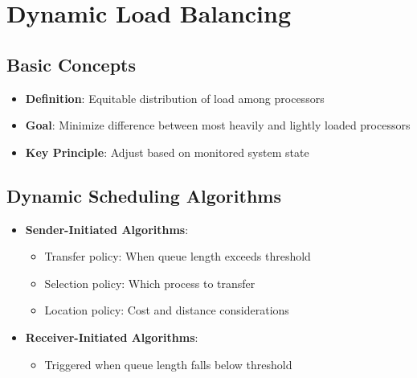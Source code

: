 \documentclass[12pt]{article}
\begin{document}
\section{Dynamic Load Balancing}

\subsection{Basic Concepts}
\begin{itemize}
\item \textbf{Definition}: Equitable distribution of load among processors
\item \textbf{Goal}: Minimize difference between most heavily and lightly loaded processors
\item \textbf{Key Principle}: Adjust based on monitored system state
\end{itemize}

\subsection{Dynamic Scheduling Algorithms}
\begin{itemize}
\item \textbf{Sender-Initiated Algorithms}:
  \begin{itemize}
  \item Transfer policy: When queue length exceeds threshold
  \item Selection policy: Which process to transfer
  \item Location policy: Cost and distance considerations
  \end{itemize}
  
\item \textbf{Receiver-Initiated Algorithms}:
  \begin{itemize}
  \item Triggered when queue length falls below threshold
  \end{itemize}
\end{itemize}
\end{document}
